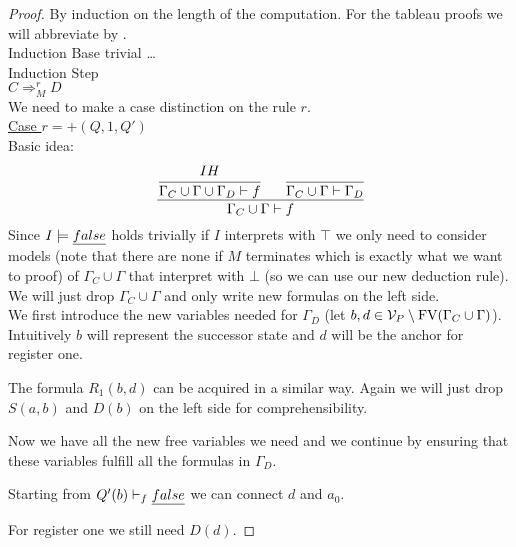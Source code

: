 \begin{proof} By induction on the length of the computation.
	For the tableau proofs we will abbreviate \false{} by \falses.\\
	Induction Base trivial \dots\\
	Induction Step\\
	$C\Rightarrow_M^r D$\\
	We need to make a case distinction on the rule $r$.\\
	\underline{Case $r=+(Q,1,Q')$}\\
	Basic idea:\\
	\[
		\cfrac
		{\cfrac{IH}{\Gamma_C\cup\Gamma\cup\Gamma_D\vdash f}\hspace{0.6cm}
			\cfrac{}{\Gamma_C\cup\Gamma\vdash\Gamma_D}}
		{\Gamma_C\cup\Gamma\vdash f}
	\]
	Since $I\models\emph{false}$ holds trivially if $I$ interprets \false{} with $\top$ we only need to consider models (note that there are none if $M$ terminates which is exactly what we want to proof) of $\Gamma_C\cup\Gamma$ that interpret \false{} with $\bot$ (so we can use our new deduction rule).\\
	We will just drop $\Gamma_C\cup\Gamma$ and only write new formulas on the left side.\\
	We first introduce the new variables needed for $\Gamma_D$ (let $b,d\in \mathcal{V}_P\setminus\text{FV}(\Gamma_C\cup\Gamma)$). Intuitively $b$ will represent the successor state and $d$ will be the anchor for register one.
	
	\begin{figure}[H]
		
	\end{figure}
	The formula $R_1(b,d)$ can be acquired in a similar way. Again we will just drop $S(a,b)$ and $D(b)$ on the left side for comprehensibility.
	
	\begin{figure}[H]
		
	\end{figure}
	Now we have all the new free variables we need and we continue by ensuring that these variables fulfill all the formulas in $\Gamma_D$.
	
	\begin{figure}[H]
		
	\end{figure}
	Starting from $Q'(b)\vdash_f\emph{false}$ we can connect $d$ and $a_0$.
	
	\begin{figure}[H]
		
	\end{figure}
	For register one we still need $D(d)$.
	

\end{proof}
